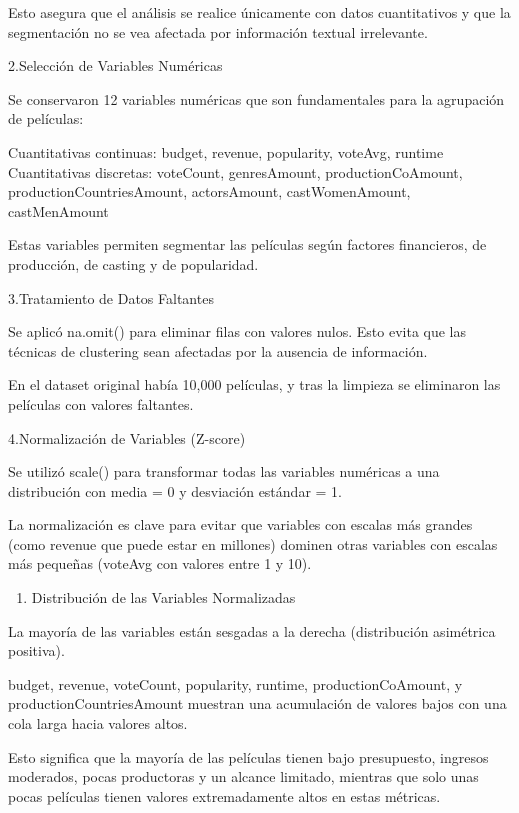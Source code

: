 \documentclass[
]{article}
\providecommand{\tightlist}{%
  \setlength{\itemsep}{0pt}\setlength{\parskip}{0pt}}
\begin{document}
Esto asegura que el análisis se realice únicamente con datos
cuantitativos y que la segmentación no se vea afectada por información
textual irrelevante.

2.Selección de Variables Numéricas

Se conservaron 12 variables numéricas que son fundamentales para la
agrupación de películas:

Cuantitativas continuas: budget, revenue, popularity, voteAvg, runtime
Cuantitativas discretas: voteCount, genresAmount, productionCoAmount,
productionCountriesAmount, actorsAmount, castWomenAmount, castMenAmount

Estas variables permiten segmentar las películas según factores
financieros, de producción, de casting y de popularidad.

3.Tratamiento de Datos Faltantes

Se aplicó na.omit() para eliminar filas con valores nulos. Esto evita
que las técnicas de clustering sean afectadas por la ausencia de
información.

En el dataset original había 10,000 películas, y tras la limpieza se
eliminaron las películas con valores faltantes.

4.Normalización de Variables (Z-score)

Se utilizó scale() para transformar todas las variables numéricas a una
distribución con media = 0 y desviación estándar = 1.

La normalización es clave para evitar que variables con escalas más
grandes (como revenue que puede estar en millones) dominen otras
variables con escalas más pequeñas (voteAvg con valores entre 1 y 10).

\begin{enumerate}
\def\labelenumi{\arabic{enumi}.}
\setcounter{enumi}{4}
\tightlist
\item
  Distribución de las Variables Normalizadas
\end{enumerate}

La mayoría de las variables están sesgadas a la derecha (distribución
asimétrica positiva).

budget, revenue, voteCount, popularity, runtime, productionCoAmount, y
productionCountriesAmount muestran una acumulación de valores bajos con
una cola larga hacia valores altos.

Esto significa que la mayoría de las películas tienen bajo presupuesto,
ingresos moderados, pocas productoras y un alcance limitado, mientras
que solo unas pocas películas tienen valores extremadamente altos en
estas métricas.
\end{document}
